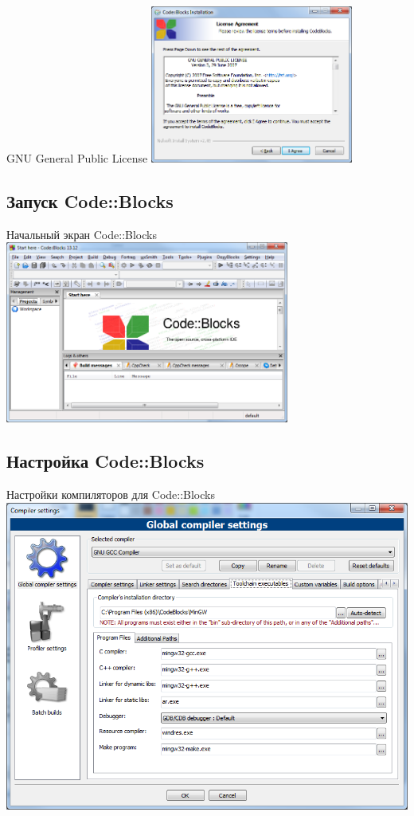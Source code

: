 \begin{frame}[t]{GNU General Public License}
\includegraphics[width=0.5\textwidth]{00_codeblocks/step2.png}
\end{frame}

\subsection{Запуск Code::Blocks}

\begin{frame}[t]{Начальный экран Code::Blocks}
\includegraphics[width=0.7\textwidth]{00_codeblocks/CodeBlocks.png}
\end{frame}

\subsection{Настройка Code::Blocks}

\begin{frame}[t]{Настройки компиляторов для Code::Blocks}
\includegraphics[width=\textwidth]{00_codeblocks/CodeBlocks_GlobalCompilerSettings.png}
\end{frame}

